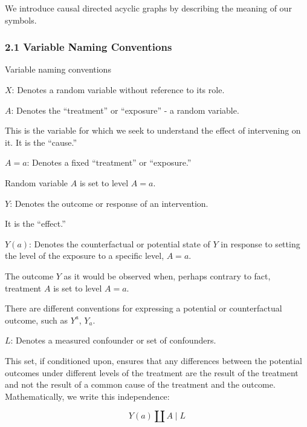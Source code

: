 \documentclass[
  single column]{article}
\begin{document}
We introduce causal directed acyclic graphs by describing the meaning of
our symbols.

\subsubsection{2.1 Variable Naming
Conventions}\label{variable-naming-conventions}

\begin{table}

\caption{\label{tbl-terminology}Variable naming conventions}

\centering{

\terminologylocalconventionssimple

}

\end{table}%

\textbf{\(X\)}: Denotes a random variable without reference to its role.

\textbf{\(A\)}: Denotes the ``treatment'' or ``exposure'' - a random
variable.

This is the variable for which we seek to understand the effect of
intervening on it. It is the ``cause.''

\textbf{\(A=a\)}: Denotes a fixed ``treatment'' or ``exposure.''

Random variable \(A\) is set to level \(A=a\).

\textbf{\(Y\)}: Denotes the outcome or response of an intervention.

It is the ``effect.''

\textbf{\(Y(a)\)}: Denotes the counterfactual or potential state of
\(Y\) in response to setting the level of the exposure to a specific
level, \(A=a\).

The outcome \(Y\) as it would be observed when, perhaps contrary to
fact, treatment \(A\) is set to level \(A=a\).

There are different conventions for expressing a potential or
counterfactual outcome, such as \(Y^a\), \(Y_a\).

\textbf{\(L\)}: Denotes a measured confounder or set of confounders.

This set, if conditioned upon, ensures that any differences between the
potential outcomes under different levels of the treatment are the
result of the treatment and not the result of a common cause of the
treatment and the outcome. Mathematically, we write this independence:

\[
Y(a) \coprod A \mid L
\]
\end{document}
